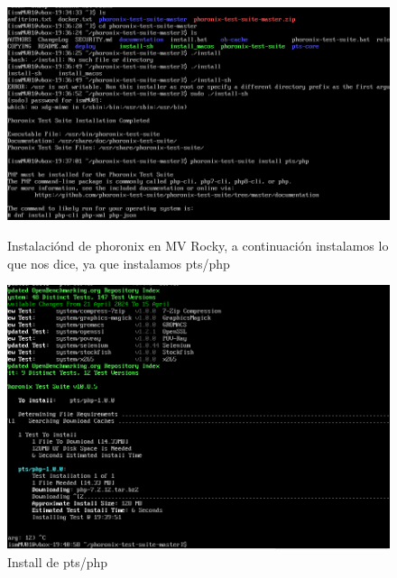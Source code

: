 \begin{itemize}
    \begin{figure}[H]
        \centering
        \begin{minipage}{0.45\textwidth}
            \centering
            \includegraphics[width=\textwidth]{images/Bloque2/mv-pho-1.png}
            \caption{Instalaciónd de phoronix en MV Rocky, a continuación instalamos lo que nos dice, ya que instalamos pts/php}
            \label{fig:image7}
        \end{minipage}
        \hfill
        \begin{minipage}{0.45\textwidth}
            \centering
            \includegraphics[width=\textwidth]{images/Bloque2/mv-pho-2.png}
            \caption{Install de pts/php}
            \label{fig:image8}
        \end{minipage}
    \end{figure}
    \begin{figure}[H]
        \centering
        \begin{minipage}{0.45\textwidth}

\end{minipage}
\end{figure}
\end{itemize}
